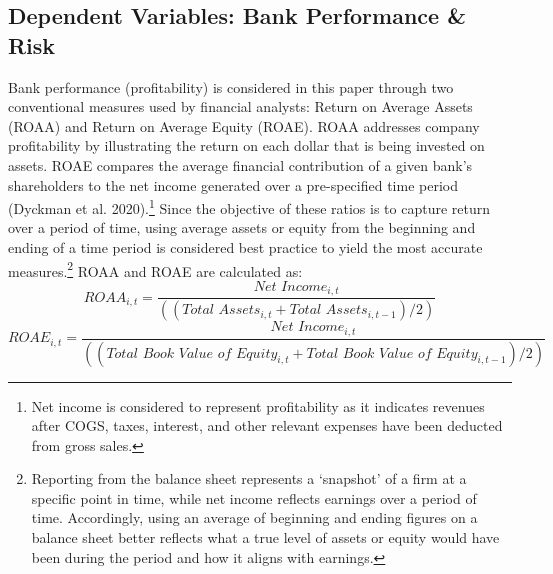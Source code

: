 \documentclass[10pt]{article} %
\begin{document}
\subsection{Dependent Variables: Bank Performance \& Risk}
Bank performance (profitability) is considered in this paper through two conventional measures used by financial analysts: Return on Average Assets (ROAA) and Return on Average Equity (ROAE). ROAA addresses company profitability by illustrating the return on each dollar that is being invested on assets. ROAE compares the average financial contribution of a given bank's shareholders to the net income generated over a pre-specified time period (Dyckman et al. 2020).\footnote{Net income is considered to represent profitability as it indicates revenues after COGS, taxes, interest, and other relevant expenses have been deducted from gross sales.} Since the objective of these ratios is to capture return over a period of time, using average assets or equity from the beginning and ending of a time period is considered best practice to yield the most accurate measures.\footnote{Reporting from the balance sheet represents a `snapshot' of a firm at a specific point in time, while net income reflects earnings over a period of time. Accordingly, using an average of beginning and ending figures on a balance sheet better reflects what a true level of assets or equity would have been during the period and how it aligns with earnings.} ROAA and ROAE are calculated as: 
\begin{equation}
ROAA_{i,t} = \frac{\textit{Net Income}_{i,t}} {((\textit{Total Assets}_{i,t} + \textit{Total Assets}_{i,t-1})/2)} 
\end{equation}
\begin{equation}
ROAE_{i,t} = \frac{\textit{Net Income}_{i,t}} {((\textit{Total Book Value of Equity}_{i,t} + \textit{Total Book Value of Equity}_{i,t-1})/2)} 
\end{equation}
\end{document}
